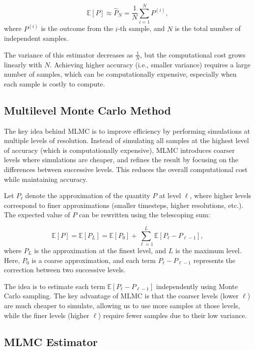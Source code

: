 \documentclass{article}
\begin{document}
\[
\mathbb{E}[P] \approx \hat{P}_N = \frac{1}{N} \sum_{i=1}^{N} P^{(i)},
\]
where \( P^{(i)} \) is the outcome from the \( i \)-th sample, and \( N \) is the total number of independent samples.

The variance of this estimator decreases as \( \frac{1}{N} \), but the computational cost grows linearly with \( N \). Achieving higher accuracy (i.e., smaller variance) requires a large number of samples, which can be computationally expensive, especially when each sample is costly to compute.

\subsection*{Multilevel Monte Carlo Method}

The key idea behind MLMC is to improve efficiency by performing simulations at multiple levels of resolution. Instead of simulating all samples at the highest level of accuracy (which is computationally expensive), MLMC introduces coarser levels where simulations are cheaper, and refines the result by focusing on the differences between successive levels. This reduces the overall computational cost while maintaining accuracy.

Let \( P_\ell \) denote the approximation of the quantity \( P \) at level \( \ell \), where higher levels correspond to finer approximations (smaller timesteps, higher resolutions, etc.). The expected value of \( P \) can be rewritten using the telescoping sum:

\[
\mathbb{E}[P] = \mathbb{E}[P_L] = \mathbb{E}[P_0] + \sum_{\ell=1}^{L} \mathbb{E}[P_\ell - P_{\ell-1}],
\]
where \( P_L \) is the approximation at the finest level, and \( L \) is the maximum level. Here, \( P_0 \) is a coarse approximation, and each term \( P_\ell - P_{\ell-1} \) represents the correction between two successive levels.

The idea is to estimate each term \( \mathbb{E}[P_\ell - P_{\ell-1}] \) independently using Monte Carlo sampling. The key advantage of MLMC is that the coarser levels (lower \( \ell \)) are much cheaper to simulate, allowing us to use more samples at those levels, while the finer levels (higher \( \ell \)) require fewer samples due to their low variance.

\subsection*{MLMC Estimator}
\end{document}
